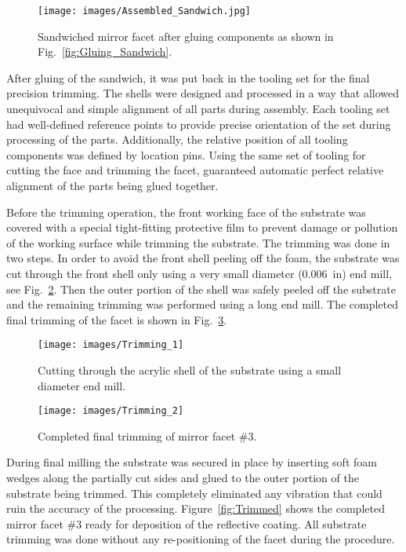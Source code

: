 \begin{figure}[ht]
    \centering
    \texttt{[image: images/Assembled\_Sandwich.jpg]}
    \caption{Sandwiched mirror facet after gluing components as shown in Fig.~\ref{fig:Gluing_Sandwich}.}
    \label{fig:Assembled_Sandwich}
\end{figure}

After gluing of the sandwich, it was put back in the tooling set for the final precision trimming. The shells were
designed and processed in a way that allowed unequivocal and simple alignment of all parts during assembly. Each
tooling set had well-defined reference points to provide precise orientation of the set during processing of the
parts. Additionally, the relative position of all tooling components was defined by location pins. Using the same
set of tooling for cutting the face and trimming the facet, guaranteed automatic perfect relative alignment of
the parts being glued together.

Before the trimming operation, the front working face of the substrate was covered with a special tight-fitting
protective film to prevent damage or pollution of the working surface while trimming the substrate. The trimming was done in two steps. In order to
avoid the front shell peeling off the foam, the substrate  was cut through the front shell only using a very small
diameter (0.006~in) end mill, see Fig.~\ref{fig:Trimming_1}. Then the outer portion of the shell was safely
peeled off the substrate and the remaining trimming was performed using a long end mill. The completed final
trimming of the facet is shown in Fig.~\ref{fig:Trimming_2}.

\begin{figure}[ht]
    \centering
    \texttt{[image: images/Trimming\_1]}
    \caption{Cutting through the acrylic shell of the substrate using a small diameter end mill.}
    \label{fig:Trimming_1}
\end{figure}

\begin{figure}[ht]
    \centering
    \texttt{[image: images/Trimming\_2]}
    \caption{Completed final trimming of mirror facet \#3.}
    \label{fig:Trimming_2}
\end{figure}

During final milling the substrate was secured in place by inserting soft foam wedges along the partially cut sides
and glued to the outer portion of the substrate being trimmed. This completely eliminated any vibration that could
ruin the accuracy of the processing. Figure~\ref{fig:Trimmed} shows the completed mirror facet \#3 ready for
deposition of the reflective coating. All substrate trimming was done without any re-positioning of the facet during
the procedure. 

